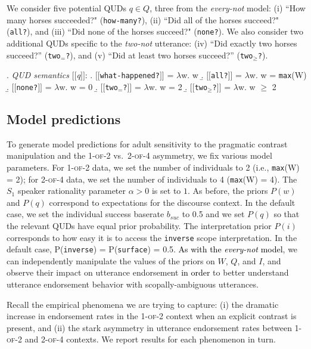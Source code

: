 \documentclass[cm]{glossa}
\newcommand{\sem}[1]{\mbox{$[\![$#1$]\!]$}}
\newcommand{\lam}{\ensuremath{\lambda}}
\newcommand{\lp}[1]{\textcolor{black}{#1}} %
\begin{document}
We consider five potential QUDs $q \in Q$, three from the \emph{every-not} model:
(i) ``How many horses succeeded?" (\texttt{how-many?}), 
(ii) ``Did all of the horses succeed?" (\texttt{all?}), and 
(iii) ``Did none of the horses succeed?" (\texttt{none?}). We also consider two additional QUDs specific to the \emph{two-not} utterance:  (iv) ``Did exactly two horses succeed?'' (\texttt{two$_=$?}), and
(v) ``Did at least two horses succeed?'' (\texttt{two$_\geq$?}).

\ex. \label{ex:qud-sem} \emph{QUD semantics} \sem{\textit{q}}:
\a. \sem{\texttt{what-happened?}} = \lam w. w
\b. \sem{\texttt{all?}} = \lam w. w = \texttt{max}(W)
\b. \sem{\texttt{none?}} = \lam w. w = 0
\b. \sem{\texttt{two$_=$?}} = \lam w. w = 2
\b. \sem{\texttt{two$_\geq$?}} = \lam w. w $\geq$ 2


\subsection{Model predictions}

To generate model predictions for adult sensitivity to the pragmatic contrast manipulation and the  \textsc{1-of-2} vs.~\textsc{2-of-4} asymmetry, we fix various model parameters. For \textsc{1-of-2} data, we set the number of individuals to 2 (i.e., \texttt{max}(W) = 2); for \textsc{2-of-4} data, we set the number of individuals to 4 (\texttt{max}(W) = 4). The $S_1$ speaker rationality parameter $\alpha > 0$ is set to $1$. As before, the priors $P(w)$ and $P(q)$ correspond to expectations for the discourse context. In the default case, we set the individual success baserate $b_{suc}$ to 0.5 and we set $P(q)$ so that the relevant QUDs have equal prior probability. The interpretation prior $P(i)$ corresponds to how easy it is to access the \texttt{inverse} scope interpretation. In the default case, P(\texttt{inverse}) = P(\texttt{surface}) = 0.5. \lp{As with the \textit{every-not} model},  we can independently manipulate the values of the priors on $W$, $Q$, and $I$, and observe their impact on utterance endorsement
\lp{in order} to better understand utterance endorsement behavior with scopally-ambiguous utterances.

Recall the empirical phenomena we are trying to capture: (i) the dramatic increase in endorsement rates in the \textsc{1-of-2} context when an explicit contrast is present, and (ii) the stark asymmetry in utterance endorsement rates between \textsc{1-of-2} and \textsc{2-of-4} contexts. We report results for each phenomenon in turn.
\end{document}
